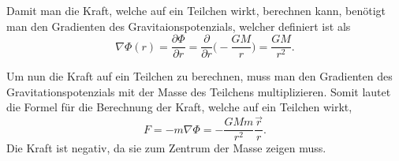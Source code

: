 Damit man die Kraft, welche auf ein Teilchen wirkt, berechnen kann, benötigt man den Gradienten des Gravitaionspotenzials, welcher definiert ist als
\begin{equation*}
	\nabla \Phi (r) = \frac{\partial \Phi}{\partial r} = \frac{\partial}{\partial r} \biggl( -\frac{GM}{r} \biggr) = \frac{GM}{r^2}.
\end{equation*}

Um nun die Kraft auf ein Teilchen zu berechnen, muss man den Gradienten des Gravitationspotenzials mit der Masse des Teilchens multiplizieren.
Somit lautet die Formel für die Berechnung der Kraft, welche auf ein Teilchen wirkt,
\begin{equation*}
	F = -m\nabla \Phi = -\frac{GMm}{r^2} \frac{\vec{r}}{r}.
\end{equation*}
Die Kraft ist negativ, da sie zum Zentrum der Masse zeigen muss.


